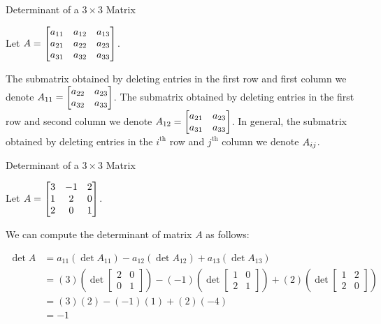 \documentclass[xcolor=dvipsnames,aspectratio=169,t]{beamer}
\begin{document}
\begin{frame}{Determinant of a $3 \times 3$ Matrix}

Let $\displaystyle A = \begin{bmatrix} a_{11} & a_{12} & a_{13} \\ a_{21} & a_{22} & a_{23} \\ a_{31} & a_{32} & a_{33} \end{bmatrix}$. 

\bbox
\bi
\ii The \alert{submatrix} obtained by deleting entries in the first row and first column we denote \alert{$\displaystyle A_{11} = \begin{bmatrix} a_{22} & a_{23} \\ a_{32} & a_{33} \end{bmatrix}$.}
\ii The submatrix obtained by deleting entries in the first row and second column we denote $\displaystyle A_{12} = \begin{bmatrix} a_{21} & a_{23} \\ a_{31} & a_{33} \end{bmatrix}$.
\ii In general, the submatrix obtained by deleting entries in the $i^{\mbox{th}}$ row and $j^{\mbox{th}}$ column we denote $\displaystyle A_{ij}$. 
\ei
\ebox

\end{frame}

\begin{frame}{Determinant of a $3 \times 3$ Matrix}

Let $\displaystyle A = \begin{bmatrix} 3  & -1 & 2 \\ 1 & 2 & 0 \\ 2 & 0 & 1 \end{bmatrix}$. 

We can compute the determinant of matrix $A$ as follows:

\begin{align*}
\det A &= a_{11} (\det A_{11} ) - a_{12}( \det A_{12}) + a_{13}( \det A_{13})\\
&= (3) \left( \det \begin{bmatrix} 2 & 0 \\ 0 & 1\end{bmatrix} \right) - (-1) \left( \det \begin{bmatrix} 1 & 0 \\ 2 & 1\end{bmatrix} \right) + (2) \left( \det \begin{bmatrix} 1 & 2  \\ 2& 0\end{bmatrix} \right)  \\
&= (3)(2) - (-1)(1) + (2)(-4)\\
&= -1
\end{align*}

\end{frame}
\end{document}
